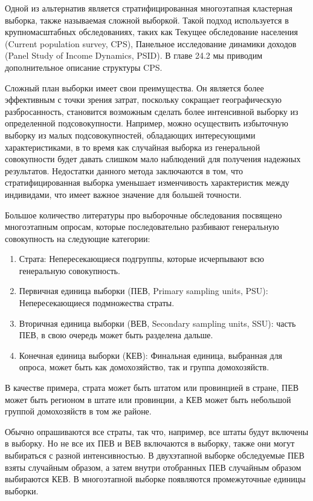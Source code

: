 Одной из альтернатив является стратифицированная многоэтапная  кластерная выборка, также называемая сложной выборкой. Такой подход используется в крупномасштабных обследованиях, таких как Текущее обследование населения (Current population survey, CPS), Панельное исследование динамики доходов (Panel Study of Income Dynamics, PSID). В главе 24.2 мы приводим дополнительное описание структуры CPS.
	
	
Сложный план выборки имеет свои преимущества. Он является более эффективным с точки зрения затрат, поскольку сокращает географическую разбросанность, становится возможным сделать более интенсивной выборку из определенной подсовокупности.  Например, можно осуществить избыточную выборку из малых подсовокупностей, обладающих интересующими характеристиками, в то время как случайная выборка из генеральной совокупности будет давать слишком мало наблюдений для получения надежных результатов. Недостатки данного метода заключаются в том, что стратифицированная выборка уменьшает изменчивость характеристик между индивидами, что имеет важное значение для большей точности.


Большое количество литературы про выборочные обследования  посвящено многоэтапным опросам, которые последовательно разбивают генеральную совокупность на следующие категории:

\begin{enumerate}
\item Страта: Непересекающиеся подгруппы, которые исчерпывают всю генеральную совокупность.
\item Первичная единица выборки (ПЕВ, Primary sampling units, PSU): Непересекающиеся подмножества страты.
\item Вторичная единица выборки (ВЕВ, Secondary sampling units, SSU): часть ПЕВ, в свою очередь может быть разделена дальше.
\item Конечная единица выборки (КЕВ): Финальная единица, выбранная для опроса, может быть как домохозяйство, так и группа домохозяйств.
\end{enumerate}


В качестве примера, страта может быть штатом или провинцией в стране, ПЕВ может быть регионом в штате или провинции, а КЕВ может быть небольшой группой домохозяйств в том же районе.
	
	
Обычно опрашиваются все страты, так что, например, все штаты будут включены в выборку. Но не все их ПЕВ и ВЕВ включаются в выборку, также они могут выбираться с разной интенсивностью. В двухэтапной выборке обследуемые ПЕВ взяты случайным образом, а затем внутри отобранных ПЕВ случайным образом выбираются КЕВ. В многоэтапной выборке появляются промежуточные единицы выборки.


